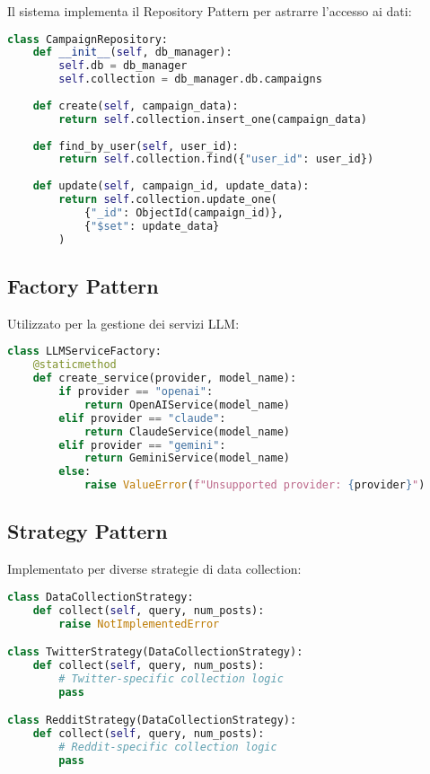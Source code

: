 \documentclass[12pt,a4paper]{report}
\begin{document}
Il sistema implementa il Repository Pattern per astrarre l'accesso ai dati:

\begin{lstlisting}[language=Python, caption=Esempio Repository Pattern]
class CampaignRepository:
    def __init__(self, db_manager):
        self.db = db_manager
        self.collection = db_manager.db.campaigns
    
    def create(self, campaign_data):
        return self.collection.insert_one(campaign_data)
    
    def find_by_user(self, user_id):
        return self.collection.find({"user_id": user_id})
    
    def update(self, campaign_id, update_data):
        return self.collection.update_one(
            {"_id": ObjectId(campaign_id)},
            {"$set": update_data}
        )
\end{lstlisting}

\subsection{Factory Pattern}

Utilizzato per la gestione dei servizi LLM:

\begin{lstlisting}[language=Python, caption=LLM Service Factory]
class LLMServiceFactory:
    @staticmethod
    def create_service(provider, model_name):
        if provider == "openai":
            return OpenAIService(model_name)
        elif provider == "claude":
            return ClaudeService(model_name)
        elif provider == "gemini":
            return GeminiService(model_name)
        else:
            raise ValueError(f"Unsupported provider: {provider}")
\end{lstlisting}

\subsection{Strategy Pattern}

Implementato per diverse strategie di data collection:

\begin{lstlisting}[language=Python, caption=Data Collection Strategy]
class DataCollectionStrategy:
    def collect(self, query, num_posts):
        raise NotImplementedError

class TwitterStrategy(DataCollectionStrategy):
    def collect(self, query, num_posts):
        # Twitter-specific collection logic
        pass

class RedditStrategy(DataCollectionStrategy):
    def collect(self, query, num_posts):
        # Reddit-specific collection logic
        pass
\end{lstlisting}
\end{document}

